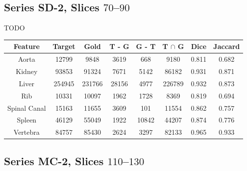 \subsection{Series SD-2, Slices $70$--$90$}

TODO

\begin{center}
\begin{tabular}{cccccccc}
\scriptsize \textbf{Feature} & \scriptsize \textbf{Target} & \scriptsize \textbf{Gold} & \scriptsize \textbf{T - G} & \scriptsize \textbf{G - T} & \scriptsize \textbf{T $\cap$ G} & \scriptsize \textbf{Dice} & \scriptsize \textbf{Jaccard} \\
\hline
\scriptsize Aorta & \scriptsize 12799 & \scriptsize 9848 & \scriptsize 3619 & \scriptsize 668 & \scriptsize 9180 & \scriptsize 0.811 & \scriptsize 0.682 \\
\scriptsize Kidney & \scriptsize 93853 & \scriptsize 91324 & \scriptsize 7671 & \scriptsize 5142 & \scriptsize 86182 & \scriptsize 0.931 & \scriptsize 0.871 \\
\scriptsize Liver & \scriptsize 254945 & \scriptsize 231766 & \scriptsize 28156 & \scriptsize 4977 & \scriptsize 226789 & \scriptsize 0.932 & \scriptsize 0.873 \\
\scriptsize Rib & \scriptsize 10331 & \scriptsize 10097 & \scriptsize 1962 & \scriptsize 1728 & \scriptsize 8369 & \scriptsize 0.819 & \scriptsize 0.694 \\
\scriptsize Spinal Canal & \scriptsize 15163 & \scriptsize 11655 & \scriptsize 3609 & \scriptsize 101 & \scriptsize 11554 & \scriptsize 0.862 & \scriptsize 0.757 \\
\scriptsize Spleen & \scriptsize 46129 & \scriptsize 55049 & \scriptsize 1922 & \scriptsize 10842 & \scriptsize 44207 & \scriptsize 0.874 & \scriptsize 0.776 \\
\scriptsize Vertebra & \scriptsize 84757 & \scriptsize 85430 & \scriptsize 2624 & \scriptsize 3297 & \scriptsize 82133 & \scriptsize 0.965 & \scriptsize 0.933 \\
\end{tabular}
\end{center}

\subsection{Series MC-2, Slices $110$--$130$}

